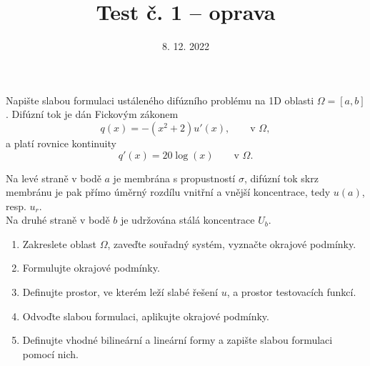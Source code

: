 \documentclass{article}
\begin{document}
\title{Test č. 1 -- oprava}
\date{8. 12. 2022}
\author{}
\maketitle


\noindent

Napište slabou formulaci ustáleného difúzního problému na 1D oblasti $\Omega=[a,b]$.
Difúzní tok je dán Fickovým zákonem
\[
    q(x) = -(x^2+2)u'(x), \qquad \textrm{v }\Omega,
\]
a platí rovnice kontinuity
\[
    q'(x) = 20\log(x) \qquad \textrm{v }\Omega.
\]

\noindent
Na levé straně v bodě $a$ je membrána s propustností $\sigma$, difúzní tok skrz membránu je pak přímo úměrný rozdílu vnitřní
a vnější koncentrace, tedy $u(a)$, resp. $u_r$.\\
Na druhé straně v bodě $b$ je udržována stálá koncentrace $U_b$.

\begin{enumerate}
\item Zakreslete oblast $\Omega$, zaveďte souřadný systém, vyznačte okrajové podmínky.
\item Formulujte okrajové podmínky.
\item Definujte prostor, ve kterém leží slabé řešení $u$, a prostor testovacích funkcí.
\item Odvoďte slabou formulaci, aplikujte okrajové podmínky.
\item Definujte vhodné bilineární a lineární formy a zapište slabou formulaci pomocí nich.
\end{enumerate}
\end{document}
